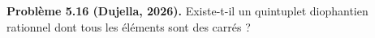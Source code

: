 \textbf{Problème 5.16 (Dujella, 2026).} Existe-t-il un quintuplet diophantien rationnel dont tous les éléments sont des carrés ?
